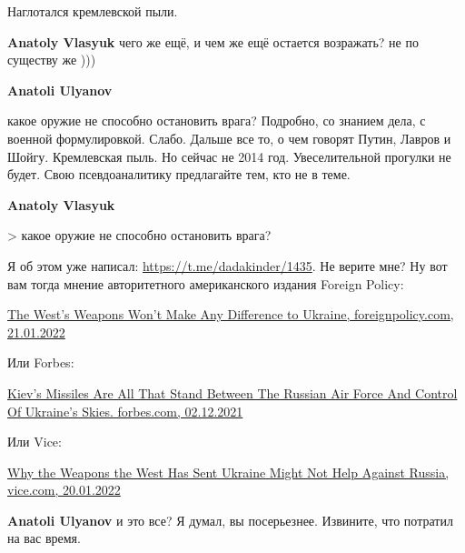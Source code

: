  
 
 
 
 
\zzSecCmt

\begin{itemize} %
Наглотался кремлевской пыли.

\begin{itemize} %
\textbf{Anatoly Vlasyuk} чего же ещё, и чем же ещё остается возражать? не по существу же )))

\textbf{Anatoli Ulyanov} 

какое оружие не способно остановить врага? Подробно, со знанием дела, с военной
формулировкой. Слабо. Дальше все то, о чем говорят Путин, Лавров и Шойгу.
Кремлевская пыль. Но сейчас не 2014 год. Увеселительной прогулки не будет. Свою
псевдоаналитику предлагайте тем, кто не в теме.

\textbf{Anatoly Vlasyuk} 

> какое оружие не способно остановить врага?

Я об этом уже написал: \url{https://t.me/dadakinder/1435}. Не верите мне? Ну вот вам
тогда мнение авторитетного американского издания Foreign Policy:

\href{https://foreignpolicy.com/2022/01/21/weapons-ukraine-russia-invasion-military/}{%
The West’s Weapons Won’t Make Any Difference to Ukraine, foreignpolicy.com, 21.01.2022%
}

Или Forbes:

\href{https://www.forbes.com/sites/davidaxe/2021/12/02/kievs-missiles-are-all-that-stand-between-the-russian-air-force-and-control-of-ukraines-skies}{%
Kiev’s Missiles Are All That Stand Between The Russian Air Force And Control Of Ukraine’s Skies. forbes.com, 02.12.2021%
}

Или Vice:

\href{https://www.vice.com/en/article/qjb357/ukraine-russia-weapons-missiles-javelin-nlaw-invasion-crimea-donbas}{%
Why the Weapons the West Has Sent Ukraine Might Not Help Against Russia, vice.com, 20.01.2022%
}

\textbf{Anatoli Ulyanov} и это все? Я думал, вы посерьезнее. Извините, что потратил на вас время.


\end{itemize}
\end{itemize}
